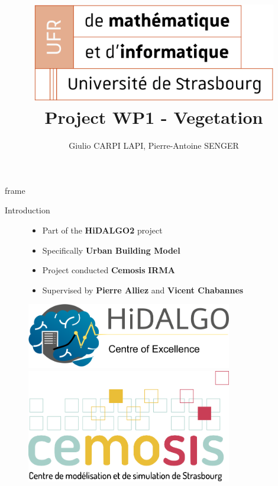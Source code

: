 \documentclass[10pt]{beamer}
\title[exMA WP1 Vegetation]{
  \includegraphics[width=0.8\textwidth]{images/logo_ufr.png}
  Project WP1 - Vegetation}
\author[Carpi Lapi - Senger]{Giulio CARPI LAPI, Pierre-Antoine SENGER}
\begin{document}
frame{\titlepage}

\begin{frame}{Introduction}
  \begin{figure}[H]
    \begin{itemize}
      \item Part of the \textbf{HiDALGO2} project
      \item Specifically \textbf{Urban Building Model}
      \item Project conducted \textbf{Cemosis}\- \textbf{IRMA}
      \item Supervised by \textbf{Pierre Alliez} and \textbf{Vicent Chabannes}
    \end{itemize}
    \centering
    \begin{minipage}{0.45\textwidth}
        \centering
        \includegraphics[width=0.8\textwidth]{images/hidalgo2.png}
    \end{minipage}
    \begin{minipage}{0.45\textwidth}
        \centering
        \includegraphics[width=0.8\textwidth]{images/logo-cemosis.png}
    \end{minipage}
\end{figure}
\end{frame}
\end{document}
